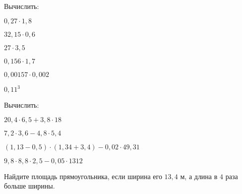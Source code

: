 \begin{class}[number=4]
\begin{listofex}
\begin{enumcols}[itemcolumns=1]
		\end{enumcols}
		\item Вычислить:
		\begin{enumcols}[itemcolumns=3]
			\item \( 0,27\cdot1,8 \)
			\item \( 32,15\cdot0,6 \)
			\item \( 27\cdot3,5 \)
			\item \( 0,156\cdot1,7 \)
			\item \( 0,00157\cdot0,002 \)
			\item \( 0,11^3 \)
		\end{enumcols}
		\item Вычислить:
		\begin{enumcols}[itemcolumns=2]
			\item \( 20,4\cdot6,5+3,8\cdot18 \)
			\item \( 7,2\cdot3,6-4,8\cdot5,4 \)
			\item \( (1,13-0,5)\cdot(1,34+3,4)-0,02\cdot49,31 \)
			\item \( 9,8\cdot8,8\cdot2,5-0,05\cdot1312 \)
		\end{enumcols}
		\item Найдите площадь прямоугольника, если ширина его \( 13,4 \) м, а длина в \( 4 \) раза больше ширины.
	\end{listofex}
\end{class}
%
%
